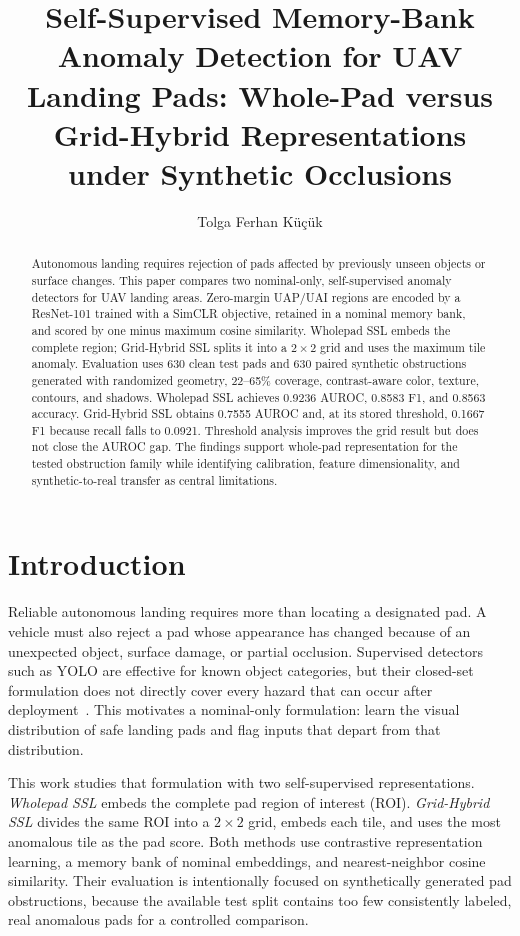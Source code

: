 \documentclass[sigconf,nonacm]{acmart}
\title{Self-Supervised Memory-Bank Anomaly Detection for UAV Landing Pads: Whole-Pad versus Grid-Hybrid Representations under Synthetic Occlusions}
\author{Tolga Ferhan K\"u\c{c}\"uk}
\affiliation{%
  \institution{Kocaeli University}
  \department{Department of Computer Engineering}
  \city{Kocaeli}
  \country{T\"urkiye}}
\begin{document}
\begin{abstract}
Autonomous landing requires rejection of pads affected by previously unseen objects or surface changes. This paper compares two nominal-only, self-supervised anomaly detectors for UAV landing areas. Zero-margin UAP/UAI regions are encoded by a ResNet-101 trained with a SimCLR objective, retained in a nominal memory bank, and scored by one minus maximum cosine similarity. Wholepad SSL embeds the complete region; Grid-Hybrid SSL splits it into a $2\times2$ grid and uses the maximum tile anomaly. Evaluation uses 630 clean test pads and 630 paired synthetic obstructions generated with randomized geometry, 22--65\% coverage, contrast-aware color, texture, contours, and shadows. Wholepad SSL achieves 0.9236 AUROC, 0.8583 F1, and 0.8563 accuracy. Grid-Hybrid SSL obtains 0.7555 AUROC and, at its stored threshold, 0.1667 F1 because recall falls to 0.0921. Threshold analysis improves the grid result but does not close the AUROC gap. The findings support whole-pad representation for the tested obstruction family while identifying calibration, feature dimensionality, and synthetic-to-real transfer as central limitations.
\end{abstract}
\maketitle

\section{Introduction}
Reliable autonomous landing requires more than locating a designated pad. A vehicle must also reject a pad whose appearance has changed because of an unexpected object, surface damage, or partial occlusion. Supervised detectors such as YOLO are effective for known object categories, but their closed-set formulation does not directly cover every hazard that can occur after deployment~\cite{redmon2016,ruff2021}. This motivates a nominal-only formulation: learn the visual distribution of safe landing pads and flag inputs that depart from that distribution.

This work studies that formulation with two self-supervised representations. \emph{Wholepad SSL} embeds the complete pad region of interest (ROI). \emph{Grid-Hybrid SSL} divides the same ROI into a $2\times2$ grid, embeds each tile, and uses the most anomalous tile as the pad score. Both methods use contrastive representation learning, a memory bank of nominal embeddings, and nearest-neighbor cosine similarity. Their evaluation is intentionally focused on synthetically generated pad obstructions, because the available test split contains too few consistently labeled, real anomalous pads for a controlled comparison.
\end{document}
